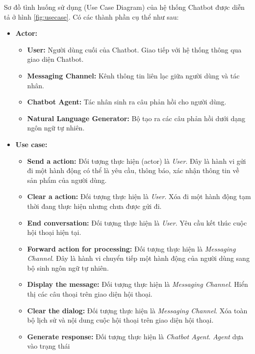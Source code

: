 Sơ đồ tình huống sử dụng (Use Case Diagram) của hệ thống Chatbot được
diễn tả ở hình \ref{fig:usecase}. Có các thành phần cụ thể như sau:

\begin{itemize}
    \item \textbf{Actor:}
    \begin{itemize}
        \item \textbf{User:} Người dùng cuối của Chatbot. Giao tiếp
        với hệ thống thông qua giao diện Chatbot.
        \item \textbf{Messaging Channel:} Kênh thông tin liên lạc
        giữa người dùng và tác nhân.
        \item \textbf{Chatbot Agent:} Tác nhân sinh ra câu phản hồi
        cho người dùng.
        \item \textbf{Natural Language Generator:} Bộ tạo ra các câu
        phản hồi dưới dạng ngôn ngữ tự nhiên.
    \end{itemize}
    \item \textbf{Use case:}
    \begin{itemize}
        \item \textbf{Send a action:} Đối tượng thực hiện (actor) là
        \textit{User}. Đây là hành vi gửi đi một hành động có thể là
        yêu cầu, thông báo, xác nhận thông tin về sản phẩm của
        người dùng.
        \item \textbf{Clear a action:} Đối tượng thực hiện là
        \textit{User}. Xóa đi một hành động tạm thời đang thực hiện
        nhưng chưa được gửi đi.
        \item \textbf{End conversation:} Đối tượng thực hiện là
        \textit{User}. Yêu cầu kết thúc cuộc hội thoại hiện tại.
        \item \textbf{Forward action for processing:} Đối tượng
        thực hiện là \textit{Messaging Channel}. Đây là hành vi
        chuyển tiếp một hành động của người dùng sang bộ sinh
        ngôn ngữ tự nhiên.
        \item \textbf{Display the message:} Đối tượng thực hiện là
        \textit{Messaging Channel}. Hiển thị các câu thoại trên
        giao diện hội thoại.
        \item \textbf{Clear the dialog:} Đối tượng thực hiện là
        \textit{Messaging Channel}. Xóa toàn bộ lịch sử và nội dung
        cuộc hội thoại trên giao diện hội thoại.
        \item \textbf{Generate response:} Đối tượng thực hiện là
        \textit{Chatbot Agent}. \textit{Agent} dựa vào trạng thái

\end{itemize}
\end{itemize}
